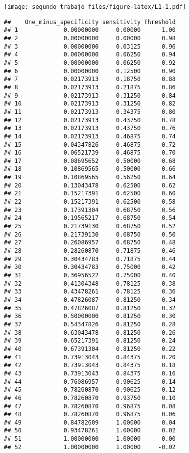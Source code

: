 \documentclass[
]{article}
\begin{document}
\texttt{[image: segundo\_trabajo\_files/figure-latex/L1-1.pdf]}

\begin{verbatim}
##    One_minus_specificity sensitivity Threshold
## 1             0.00000000     0.00000      1.00
## 2             0.00000000     0.00000      0.98
## 3             0.00000000     0.03125      0.96
## 4             0.00000000     0.06250      0.94
## 5             0.00000000     0.06250      0.92
## 6             0.00000000     0.12500      0.90
## 7             0.02173913     0.18750      0.88
## 8             0.02173913     0.21875      0.86
## 9             0.02173913     0.31250      0.84
## 10            0.02173913     0.31250      0.82
## 11            0.02173913     0.34375      0.80
## 12            0.02173913     0.43750      0.78
## 13            0.02173913     0.43750      0.76
## 14            0.02173913     0.46875      0.74
## 15            0.04347826     0.46875      0.72
## 16            0.06521739     0.46875      0.70
## 17            0.08695652     0.50000      0.68
## 18            0.10869565     0.50000      0.66
## 19            0.10869565     0.56250      0.64
## 20            0.13043478     0.62500      0.62
## 21            0.15217391     0.62500      0.60
## 22            0.15217391     0.62500      0.58
## 23            0.17391304     0.68750      0.56
## 24            0.19565217     0.68750      0.54
## 25            0.21739130     0.68750      0.52
## 26            0.21739130     0.68750      0.50
## 27            0.26086957     0.68750      0.48
## 28            0.28260870     0.71875      0.46
## 29            0.30434783     0.71875      0.44
## 30            0.30434783     0.75000      0.42
## 31            0.36956522     0.75000      0.40
## 32            0.41304348     0.78125      0.38
## 33            0.43478261     0.78125      0.36
## 34            0.47826087     0.81250      0.34
## 35            0.47826087     0.81250      0.32
## 36            0.50000000     0.81250      0.30
## 37            0.54347826     0.81250      0.28
## 38            0.63043478     0.81250      0.26
## 39            0.65217391     0.81250      0.24
## 40            0.67391304     0.81250      0.22
## 41            0.73913043     0.84375      0.20
## 42            0.73913043     0.84375      0.18
## 43            0.73913043     0.84375      0.16
## 44            0.76086957     0.90625      0.14
## 45            0.78260870     0.90625      0.12
## 46            0.78260870     0.93750      0.10
## 47            0.78260870     0.96875      0.08
## 48            0.78260870     0.96875      0.06
## 49            0.84782609     1.00000      0.04
## 50            0.93478261     1.00000      0.02
## 51            1.00000000     1.00000      0.00
## 52            1.00000000     1.00000     -0.02
\end{verbatim}
\end{document}

